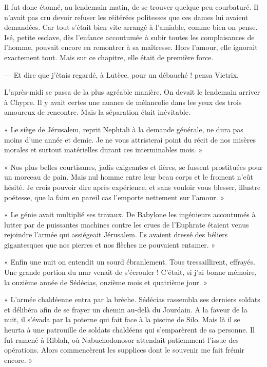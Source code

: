 \documentclass[a4paper, 11pt, oneside, polutonikogreek, french]{article}
\begin{document}
Il fut donc étonné, au lendemain matin, de se trouver quelque peu courbaturé. Il n'avait pas cru devoir refuser les réitérées politesses que ces dames lui avaient demandées. Car tout s'était bien vite arrangé à l'amiable, comme bien on pense. Isé, petite esclave, dès l'enfance accoutumée à subir toutes les complaisances de l'homme, pouvait encore en remontrer à sa maîtresse. Hors l'amour, elle ignorait exactement tout. Mais sur ce chapitre, elle était de première force.

--- Et dire que j'étais regardé, à Lutèce, pour un débauché ! pensa Vietrix.

\bigskip
\centerline{\EightStarTaper}
\centerline{\EightStarTaper\EightStarTaper}
\bigskip

L'après-midi se passa de la plus agréable manière. On devait le lendemain arriver à Chypre. Il y avait certes une nuance de mélancolie dans les yeux des trois amoureux de rencontre. Mais la séparation était inévitable.

\bigskip
\centerline{\EightStarTaper}
\centerline{\EightStarTaper\EightStarTaper}
\bigskip

« Le siège de Jérusalem, reprit Nephtali à la demande générale, ne dura pas moins d'une année et demie. Je ne vous attristerai point du récit de nos misères morales et surtout matérielles durant ces interminables mois. »

« Nos plus belles courtisanes, jadis exigeantes et fières, se fussent prostituées pour un morceau de pain. Mais nul homme entre leur beau corps et le froment n'eût hésité. Je crois pouvoir dire après expérience, et sans vouloir vous blesser, illustre poétesse, que la faim en pareil cas l'emporte nettement sur l'amour. »

« Le génie avait multiplié ses travaux. De Babylone les ingénieurs accoutumés à lutter par de puissantes machines contre les crues de l'Euphrate étaient venus rejoindre l'armée qui assiégeait Jérusalem. Ils avaient dressé des béliers gigantesques que nos pierres et nos flèches ne pouvaient entamer. »

« Enfin une nuit on entendit un sourd ébranlement. Tous tressaillirent, effrayés. Une grande portion du mur venait de s'écrouler ! C'était, si j'ai bonne mémoire, la onzième année de Sédécias, onzième mois et quatrième jour. »

« L'armée chaldéenne entra par la brèche. Sédécias rassembla ses derniers soldats et délibéra afin de se frayer un chemin au-delà du Jourdain. A la faveur de la nuit, il s'évada par la poterne qui fait face à la piscine de Silo. Mais là il se heurta à une patrouille de soldats chaldéens qui s'emparèrent de sa personne. Il fut ramené à Riblah, où Nabuchodonosor attendait patiemment l'issue des opérations. Alors commencèrent les supplices dont le souvenir me fait frémir encore. »
\end{document}

